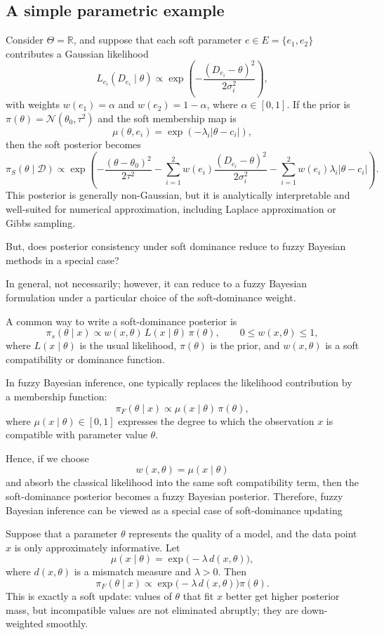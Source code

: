 \documentclass[twoside]{article}
\begin{document}
\subsection{A simple parametric example}

Consider $\Theta=\mathbb{R}$, and suppose that each soft parameter $e\in E=\{e_1,e_2\}$ contributes a Gaussian likelihood
\[
L_{e_i}(D_{e_i}\mid \theta)\propto \exp\left(-\frac{(D_{e_i}-\theta)^2}{2\sigma_i^2}\right),
\]
with weights $w(e_1)=\alpha$ and $w(e_2)=1-\alpha$, where $\alpha\in[0,1]$.  
If the prior is $\pi(\theta)=\mathcal{N}(\theta_0,\tau^2)$ and the soft membership map is
\[
\mu(\theta,e_i)=\exp\left(-\lambda_i|\theta-c_i|\right),
\]
then the soft posterior becomes
\[
\pi_S(\theta\mid \mathcal{D})
\propto
\exp\left(
-\frac{(\theta-\theta_0)^2}{2\tau^2}
-\sum_{i=1}^2 w(e_i)\frac{(D_{e_i}-\theta)^2}{2\sigma_i^2}
-\sum_{i=1}^2 w(e_i)\lambda_i|\theta-c_i|
\right).
\]
This posterior is generally non-Gaussian, but it is analytically interpretable and well-suited for numerical approximation, including Laplace approximation or Gibbs sampling. 

\begin{rem}
But, does posterior consistency under soft dominance reduce to fuzzy Bayesian methods in a special case?

In general, not necessarily; however, it can reduce to a fuzzy Bayesian formulation under a particular choice of the soft-dominance weight.

A common way to write a soft-dominance posterior is
\[
\pi_s(\theta \mid x)
\propto
w(x,\theta)\,L(x\mid \theta)\,\pi(\theta),
\qquad 0 \le w(x,\theta) \le 1,
\]
where $L(x\mid\theta)$ is the usual likelihood, $\pi(\theta)$ is the prior, and
$w(x,\theta)$ is a soft compatibility or dominance function.

In fuzzy Bayesian inference, one typically replaces the likelihood contribution by a membership function:
\[
\pi_F(\theta \mid x)
\propto
\mu(x\mid\theta)\,\pi(\theta),
\]
where $\mu(x\mid\theta)\in[0,1]$ expresses the degree to which the observation $x$
is compatible with parameter value $\theta$.

Hence, if we choose
\[
w(x,\theta)=\mu(x\mid\theta)
\]
and absorb the classical likelihood into the same soft compatibility term, then the soft-dominance posterior becomes a fuzzy Bayesian posterior. Therefore, fuzzy Bayesian inference can be viewed as a special case of soft-dominance updating
\end{rem}

\begin{eg}
Suppose that a parameter $\theta$ represents the quality of a model, and the data point $x$ is only approximately informative. Let
\[
\mu(x\mid\theta)=\exp\!\bigl(-\lambda\,d(x,\theta)\bigr),
\]
where $d(x,\theta)$ is a mismatch measure and $\lambda>0$. Then
\[
\pi_F(\theta\mid x)\propto \exp\!\bigl(-\lambda\,d(x,\theta)\bigr)\pi(\theta).
\]
This is exactly a soft update: values of $\theta$ that fit $x$ better get higher posterior mass, but incompatible values are not eliminated abruptly; they are down-weighted smoothly.
\end{eg}
\end{document}
